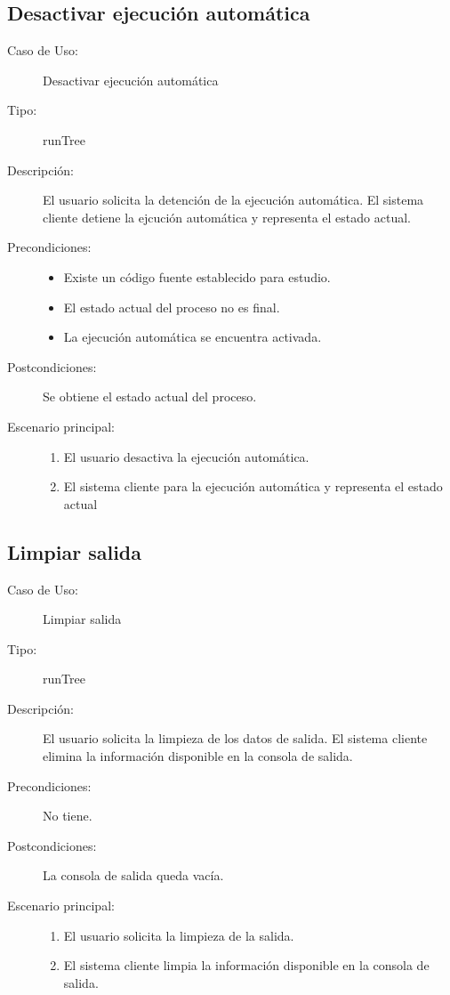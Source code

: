 \subsection{Desactivar ejecución automática} 
\begin{framed}
\FloatBarrier
\begin{description}
   \item[Caso de Uso:] Desactivar ejecución automática
   \item [Tipo:] runTree
   \item[Descripción:] 
   El usuario solicita la detención de la ejecución automática. 
   El sistema cliente detiene la ejcución automática y representa el estado actual.
   \item[Precondiciones:] \hfill 
   \begin{itemize}
   \item Existe un código fuente establecido para estudio. 
   \item El estado actual del proceso no es final.
   \item La ejecución automática se encuentra activada.
   \end{itemize}
   \item[Postcondiciones:] 
   Se obtiene el estado actual del proceso.
   \item[Escenario principal:] \hfill
   \begin{enumerate}
   \item El usuario desactiva la ejecución automática.
   \item El sistema cliente para la ejecución automática y representa el estado actual 
   \end{enumerate}
\end{description}
 \FloatBarrier
\end{framed}

\subsection{Limpiar salida} 
\begin{framed}
\FloatBarrier
\begin{description}
   \item[Caso de Uso:] Limpiar salida
   \item [Tipo:] runTree
   \item[Descripción:] 
   El usuario solicita la limpieza de los datos de salida. 
   El sistema cliente elimina la información disponible en la consola de salida.
   \item[Precondiciones:]
   No tiene.
   \item[Postcondiciones:] 
   La consola de salida queda vacía.
   \item[Escenario principal:] \hfill
   \begin{enumerate}
   \item El usuario solicita la limpieza de la salida.
   \item El sistema cliente limpia la información disponible en la consola de salida.  
   \end{enumerate}
\end{description}
 \FloatBarrier
\end{framed}

